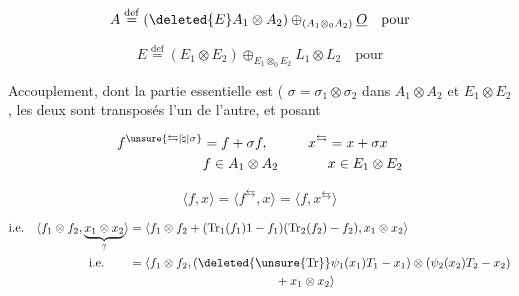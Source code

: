 
\[ A\overset{\mathrm{def}}{=}(\deleted{E}A_1\otimes A_2)\oplus_{(A_1\otimes_0 A_2)}\underline{O}\quad\text{pour} \]


\[ E\overset{\mathrm{def}}{=}(E_1\otimes E_2)\oplus_{E_1\otimes_0 E_2}L_1\otimes L_2\quad\text{pour} \]


Accouplement,  dont la partie essentielle est  (  $\sigma=\sigma_1\otimes\sigma_2$ dans $A_1\otimes A_2$ et $E_1\otimes E_2$, les deux sont transposés l'un de l'autre, et posant

\[
\begin{aligned}
 f^{\unsure{\leftrightarrows|\natural|\sigma}}&=f+\sigma f,\qquad &x^{\leftrightarrows}&=x+\sigma x\\
 &f\in A_1\otimes A_2 &&x\in E_1\otimes E_2
\end{aligned}
\]


\[ \langle f,x\rangle=\langle f^{\leftrightarrows},x\rangle=\langle f,x^{\leftrightarrows}\rangle \]

\[
\begin{aligned}
\text{i.e.}\quad\langle f_1\otimes f_2,\underbrace{x_1\otimes x_2}_{?}\rangle
 &=\langle f_1\otimes f_2+(\mathrm{Tr}_1(f_1)1-f_1)(\mathrm{Tr}_{2}(f_2)-f_2),x_1\otimes x_2\rangle\\
\text{i.e.}\qquad
 &=\langle f_1\otimes f_2,(\deleted{\unsure{\mathrm{Tr}}}\psi_1(x_1)T_1-x_1)\otimes(\psi_2(x_2)T_2-x_2)\\
 &\hspace{12em}+x_1\otimes x_2\rangle
\end{aligned}
\]

